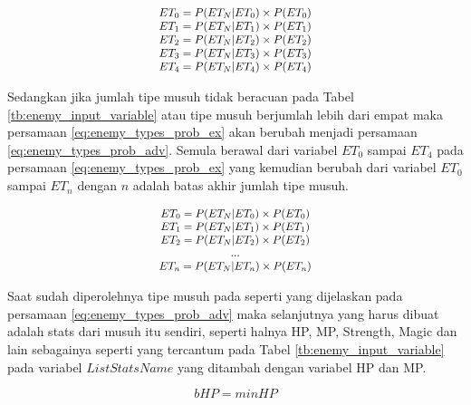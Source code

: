 \begin{equation}\label{eq:enemy_types_prob_ex}
\resizebox{0.35\textwidth}{!}{%
	$\begin{matrix}
	ET_{0} = P(ET_{N}| ET_{0}) \times P(ET_{0})\\
	ET_{1} = P(ET_{N}| ET_{1}) \times P(ET_{1})\\
	ET_{2} = P(ET_{N}| ET_{2}) \times P(ET_{2})\\
	ET_{3} = P(ET_{N}| ET_{3}) \times P(ET_{3})\\
	ET_{4} = P(ET_{N}| ET_{4}) \times P(ET_{4})
	\end{matrix}$%
}
\end{equation}

Sedangkan jika jumlah tipe musuh tidak beracuan pada Tabel \ref{tb:enemy_input_variable} atau tipe musuh berjumlah lebih dari empat maka persamaan \ref{eq:enemy_types_prob_ex} akan berubah menjadi persamaan \ref{eq:enemy_types_prob_adv}. Semula berawal dari variabel $ET_{0}$ sampai $ET_{4}$ pada persamaan \ref{eq:enemy_types_prob_ex} yang kemudian berubah dari variabel $ET_{0}$ sampai $ET_{n}$ dengan $n$ adalah batas akhir jumlah tipe musuh.
\vspace{1ex}

\begin{equation}\label{eq:enemy_types_prob_adv}
\resizebox{0.35\textwidth}{!}{%
	$\begin{matrix}
	ET_{0} = P(ET_{N}| ET_{0}) \times P(ET_{0})\\
	ET_{1} = P(ET_{N}| ET_{1}) \times P(ET_{1})\\
	ET_{2} = P(ET_{N}| ET_{2}) \times P(ET_{2})\\
	...\\
	ET_{n} = P(ET_{N}| ET_{n}) \times P(ET_{n})
	\end{matrix}$%
}
\end{equation}

Saat sudah diperolehnya tipe musuh pada seperti yang dijelaskan pada persamaan \ref{eq:enemy_types_prob_adv} maka selanjutnya yang harus dibuat adalah stats dari musuh itu sendiri, seperti halnya HP, MP, Strength, Magic dan lain sebagainya seperti yang tercantum pada Tabel \ref{tb:enemy_input_variable} pada variabel $List Stats Name$ yang ditambah dengan variabel HP dan MP.
\vspace{1ex}

\begin{equation}\label{eq:enemy_types_prob_bhp}
bHP = minHP
\end{equation}

